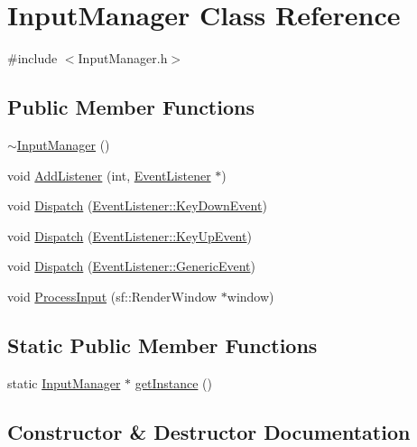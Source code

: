 \hypertarget{class_input_manager}{}\section{Input\+Manager Class Reference}
\label{class_input_manager}


{\ttfamily \#include $<$Input\+Manager.\+h$>$}

\subsection*{Public Member Functions}
\begin{DoxyCompactItemize}
\item 
\hyperlink{class_input_manager_af518290877dd183606709d5852db5491}{$\sim$\+Input\+Manager} ()
\item 
void \hyperlink{class_input_manager_a1f055ac31c702b3c4d183d9294b9aa6b}{Add\+Listener} (int, \hyperlink{class_event_listener}{Event\+Listener} $\ast$)
\item 
void \hyperlink{class_input_manager_a64666af03343a9065b8a0c7905aecd02}{Dispatch} (\hyperlink{class_event_listener_ae72c5cb67f8dc880170bf2137837f6ce}{Event\+Listener\+::\+Key\+Down\+Event})
\item 
void \hyperlink{class_input_manager_a9df2113b8d6c81099cebcbc80423a72e}{Dispatch} (\hyperlink{class_event_listener_a69daf2aeedcab55e1f2c1c178206789e}{Event\+Listener\+::\+Key\+Up\+Event})
\item 
void \hyperlink{class_input_manager_ac0c483ffc6437104b29f2e6f985f07ca}{Dispatch} (\hyperlink{class_event_listener_a23add62d02511a54eba0bae8208f9f48}{Event\+Listener\+::\+Generic\+Event})
\item 
void \hyperlink{class_input_manager_a0e4ced1e81e16392a445278e92d23ab9}{Process\+Input} (sf\+::\+Render\+Window $\ast$window)
\end{DoxyCompactItemize}
\subsection*{Static Public Member Functions}
\begin{DoxyCompactItemize}
\item 
static \hyperlink{class_input_manager}{Input\+Manager} $\ast$ \hyperlink{class_input_manager_a4d4852e7a0451fe53d9c116d8c3100d8}{get\+Instance} ()
\end{DoxyCompactItemize}


\subsection{Constructor \& Destructor Documentation}
\hypertarget{class_input_manager_af518290877dd183606709d5852db5491}{}\label{class_input_manager_af518290877dd183606709d5852db5491} 
